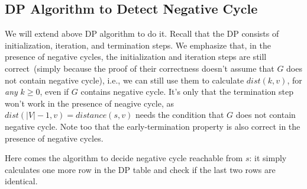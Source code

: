 %

\subsection*{DP Algorithm to Detect Negative Cycle}

We will extend above DP algorithm to do it.
Recall that the DP consists of initialization, iteration, and termination steps.
We emphasize that, in the presence of negative cycles, the initialization and iteration
steps are still correct~(simply because the proof of their correctness doesn't assume that $G$ does not contain negative cycle),
i.e., we can still use them to calculate $dist(k,v)$, for \emph{any} $k\ge 0$, even if $G$ contains negative cycle.
It's only that the termination step won't work in the presence of neagive cycle,
as $dist(|V| - 1, v) = distance(s,v)$ needs the condition that $G$ does not contain negative cycle.
Note too that the early-termination property is also correct in the presence of negative cycles.

Here comes the algorithm to decide negative cycle reachable from $s$:
it simply calculates one more row in the DP table and check if the last two rows are identical.

\begin{algorithmblock}[0.8\textwidth]
	\xxx
	\xxx
	\xxx
	\xxx
	\xxx
	\xxx
\end{algorithmblock}

